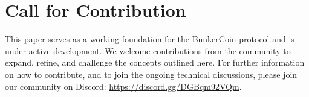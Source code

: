 \documentclass{article}
\begin{document}
\section{Call for Contribution}

This paper serves as a working foundation for the BunkerCoin protocol and is under active development. We welcome contributions from the community to expand, refine, and challenge the concepts outlined here. For further information on how to contribute, and to join the ongoing technical discussions, please join our community on Discord: \url{https://discord.gg/DGBqm92VQm}.
\end{document}
